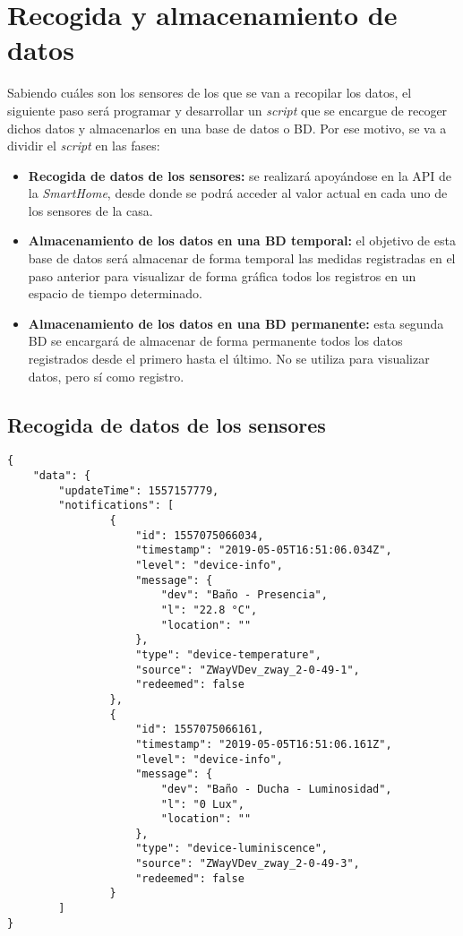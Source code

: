 \chapter{Recogida y almacenamiento de datos}
Sabiendo cuáles son los sensores de los que se van a recopilar los datos, el siguiente paso será programar y desarrollar un  \textit{script} que se encargue de recoger dichos datos y almacenarlos en una base de datos o BD. Por ese motivo, se va a dividir el \textit{script} en las fases:

\begin{itemize}
    \item \textbf{Recogida de datos de los sensores:} se realizará apoyándose en la API de la \textit{SmartHome}, desde donde se podrá acceder al valor actual en cada uno de los sensores de la casa.
    \item \textbf{Almacenamiento de los datos en una BD temporal:} el objetivo de esta base de datos será almacenar de forma temporal las medidas registradas en el paso anterior para visualizar de forma gráfica todos los registros en un espacio de tiempo determinado.
    \item \textbf{Almacenamiento de los datos en una BD permanente:} esta segunda BD se encargará de almacenar de forma permanente todos los datos registrados desde el primero hasta el último. No se utiliza para visualizar datos, pero sí como registro.
\end{itemize}

\section{Recogida de datos de los sensores}

\begin{lstlisting}[language=inform,firstnumber=1, caption={Respuesta Notificaciones},label=C_resultado_noti]
{
	"data": {
		"updateTime": 1557157779,
		"notifications": [
				{
					"id": 1557075066034,
					"timestamp": "2019-05-05T16:51:06.034Z",
					"level": "device-info",
					"message": {
						"dev": "Baño - Presencia",
						"l": "22.8 °C",
						"location": ""
					},
					"type": "device-temperature",
					"source": "ZWayVDev_zway_2-0-49-1",
					"redeemed": false
				},
				{
					"id": 1557075066161,
					"timestamp": "2019-05-05T16:51:06.161Z",
					"level": "device-info",
					"message": {
						"dev": "Baño - Ducha - Luminosidad",
						"l": "0 Lux",
						"location": ""
					},
					"type": "device-luminiscence",
					"source": "ZWayVDev_zway_2-0-49-3",
					"redeemed": false
				}
		]
}
\end{lstlisting}


